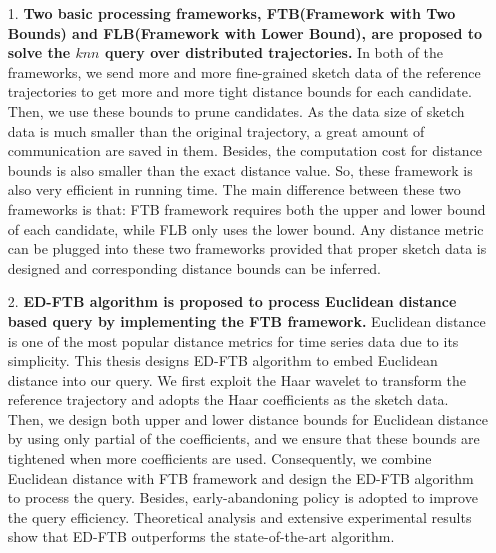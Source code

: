 \begin{itemize}
\item[1.] \textbf{Two basic processing frameworks, FTB(Framework with Two Bounds) and FLB(Framework with Lower Bound), are proposed to solve the $knn$ query over distributed trajectories.} In both of the frameworks, we  send  more and more fine-grained sketch data of the reference trajectories to get more and more tight distance bounds for each candidate. Then, we use these bounds to prune candidates. 
As the data size of sketch data is much smaller than the original trajectory, a great amount of communication are saved in them. Besides, the computation cost for distance bounds is also smaller than the exact distance value. So, these framework is also very efficient in running time. 
The main difference between these two frameworks is that: FTB framework  requires both the upper and lower bound of each candidate, while FLB only uses the lower bound. Any distance metric can be plugged into  these two frameworks provided that proper sketch data is designed and corresponding distance bounds can be inferred.

\item[2.] \textbf{ ED-FTB algorithm is proposed to process  Euclidean distance based query by implementing the FTB framework.} 
Euclidean distance is one of the most popular distance metrics for time series data due to its simplicity. This thesis designs ED-FTB algorithm to embed Euclidean distance into our query.
We first exploit the Haar wavelet to transform the reference trajectory and adopts the Haar coefficients as the sketch data. Then, we design both upper and lower distance  bounds for Euclidean distance by using only partial of the coefficients, and we ensure that these bounds are tightened when more coefficients are used.
Consequently, we combine Euclidean distance with FTB framework and design the  ED-FTB algorithm to process the query. Besides, early-abandoning policy is adopted to improve the query efficiency. Theoretical analysis and extensive experimental results  show that ED-FTB outperforms the state-of-the-art algorithm.


\end{itemize}

